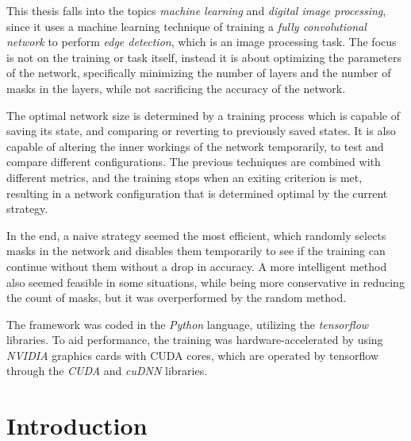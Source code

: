 \documentclass[12pt]{report}
\begin{document}
This thesis falls into the topics \textit{machine learning} and \textit{digital image processing}, since it uses a machine learning technique of training a \textit{fully convolutional network} to perform \textit{edge detection}, which is an image processing task. The focus is not on the training or task itself, instead it is about optimizing the parameters of the network, specifically minimizing the number of layers and the number of masks in the layers, while not sacrificing the accuracy of the network.\par
The optimal network size is determined by a training process which is capable of saving its state, and comparing or reverting to previously saved states. It is also capable of altering the inner workings of the network temporarily, to test and compare different configurations. The previous techniques are combined with different metrics, and the training stops when an exiting criterion is met, resulting in a network configuration that is determined optimal by the current strategy.\par
In the end, a naive strategy seemed the most efficient, which randomly selects masks in the network and disables them temporarily to see if the training can continue without them without a drop in accuracy. A more intelligent method also seemed feasible in some situations, while being more conservative in reducing the count of masks, but it was overperformed by the random method.\par
\par
The framework was coded in the \textit{Python} language, utilizing the \textit{tensorflow} libraries. To aid performance, the training was hardware-accelerated by using \textit{NVIDIA} graphics cards with CUDA cores, which are operated by tensorflow through the \textit{CUDA} and \textit{cuDNN} libraries.

\chapter*{Introduction}
\end{document}
